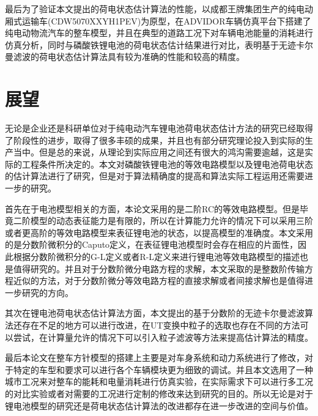 最后为了验证本文提出的荷电状态估计算法的性能，以成都王牌集团生产的纯电动厢式运输车(CDW5070XXYH1PEV)为原型，在ADVIDOR车辆仿真平台下搭建了纯电动物流汽车的整车模型，并且在典型的道路工况下对车辆电池能量的消耗进行仿真分析，同时与磷酸铁锂电池的荷电状态估计结果进行对比，表明基于无迹卡尔曼滤波的荷电状态估计算法具有较为准确的性能和较高的精度。
\section{展望}
无论是企业还是科研单位对于纯电动汽车锂电池荷电状态估计方法的研究已经取得了阶段性的进步，取得了很多丰硕的成果，并且也有部分研究理论投入到实际的生产当中。但是总的来说，从理论到实际应用之间还有很大的鸿沟需要逾越，这是实际的工程条件所决定的。本文对磷酸铁锂电池的等效电路模型以及锂电池荷电状态的估计算法进行了研究，但是对于算法精确度的提高和算法实际工程运用还需要进一步的研究。

首先在于电池模型相关的方面，本论文采用的是二阶RC的等效电路模型。但是毕竟二阶模型的动态表征能力是有限的，所以在计算能力允许的情况下可以采用三阶或者更高阶的等效电路模型来表征锂电池的状态，以提高模型的准确度。本文采用的是分数阶微积分的Caputo定义，在表征锂电池模型时会存在相应的片面性，因此根据分数阶微积分的G-L定义或者R-L定义来进行锂电池等效电路模型的描述也是值得研究的。并且对于分数阶微分电路方程的求解，本文采取的是整数阶传输方程近似的方法，对于分数阶微分等效电路方程的直接求解或者间接求解也是值得进一步研究的方向。

其次在锂电池荷电状态估计算法方面，本文提出的基于分数阶的无迹卡尔曼滤波算法还存在不足的地方可以进行改进，在UT变换中粒子的选取也存在不同的方法可以尝试，在计算量允许的情况下可以引入粒子滤波等方法来提高估计算法的精度。

最后本论文在整车方针模型的搭建上主要是对车身系统和动力系统进行了修改，对于特定的车型和要求可以进行各个车辆模块更为细致的调试。并且本文选用了一种城市工况来对整车的能耗和电量消耗进行仿真实验，在实际需求下可以进行多工况的对比实验或者对需要的工况进行定制的修改来达到研究的目的。所以无论是对于锂电池模型的研究还是荷电状态估计算法的改进都存在进一步改进的空间与价值。